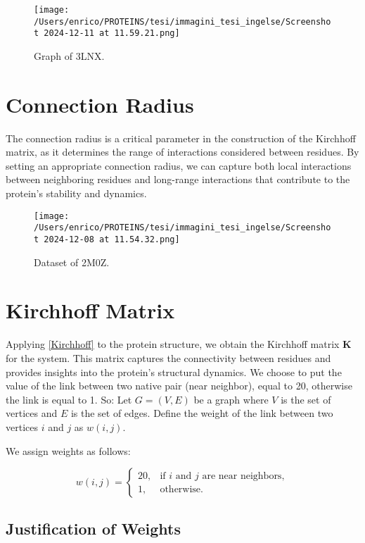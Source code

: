 \documentclass[English, Lau, oneside]{sapthesis}
\begin{document}
\begin{itemize}
\begin{figure}[h!]
    \centering
    \texttt{[image: /Users/enrico/PROTEINS/tesi/immagini\_tesi\_ingelse/Screenshot 2024-12-11 at 11.59.21.png]}
    \caption{Graph of 3LNX.}
\end{figure}
\section*{Connection Radius}
The connection radius is a critical parameter in the construction of the Kirchhoff matrix, as it determines the range of interactions considered between residues. By setting an appropriate connection radius, we can capture both local interactions between neighboring residues and long-range interactions that contribute to the protein's stability and dynamics.

\begin{figure}[h!]
    \centering
    \texttt{[image: /Users/enrico/PROTEINS/tesi/immagini\_tesi\_ingelse/Screenshot 2024-12-08 at 11.54.32.png]}
    \caption{Dataset of 2M0Z.}
\end{figure}



\section*{Kirchhoff Matrix}
Applying \eqref{Kirchhoff} to the protein structure, we obtain the Kirchhoff matrix \(\mathbf{K}\) for the system. This matrix captures the connectivity between residues and provides insights into the protein's structural dynamics. 
We choose to put the value of the link between two native pair (near neighbor), equal to 20, otherwise the link is equal to 1.
So:
Let \( G = (V, E) \) be a graph where \( V \) is the set of vertices and \( E \) is the set of edges. Define the weight of the link between two vertices \( i \) and \( j \) as \( w(i, j) \).

We assign weights as follows:

\[
w(i, j) =
\begin{cases}
20, & \text{if } i \text{ and } j \text{ are near neighbors}, \\
1, & \text{otherwise}.
\end{cases}
\]

\subsection*{Justification of Weights}


\end{itemize}
\end{document}
